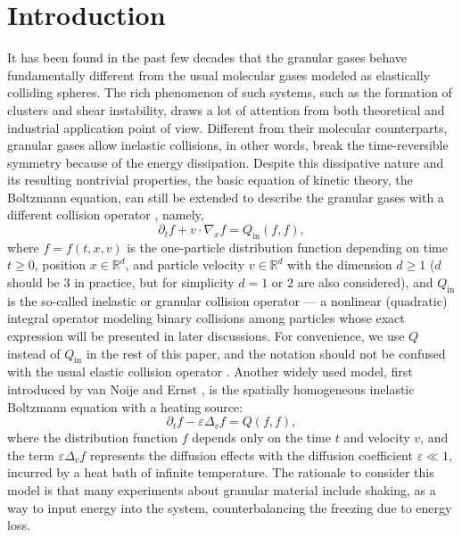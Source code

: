 \documentclass[review, times]{elsarticle}
\begin{document}
\linenumbers

\section{Introduction}

It has been found in the past few decades that the granular gases behave fundamentally different from the usual molecular gases modeled as elastically colliding spheres. The rich phenomenon of such systems, such as the formation of clusters and shear instability, draws a lot of attention from both theoretical and industrial application point of view. Different from their molecular counterparts, granular gases allow inelastic collisions, in other words, break the time-reversible symmetry because of the energy dissipation. Despite this dissipative nature and its resulting nontrivial properties, the basic equation of kinetic theory, the Boltzmann equation, can still be extended to describe the granular gases with a different collision operator \cite{BP04}, namely,
\begin{equation}
\partial_t f + v \cdot \nabla_x f = Q_{\text{in}}(f,f),
\label{boltz}
\end{equation}
where $f=f(t,x,v)$ is the one-particle distribution function depending on time $t \geq 0$, position $x \in \mathbb{R}^d$, and particle velocity $v \in \mathbb{R}^d$ with the dimension $d \geq 1$ ($d$ should be 3 in practice, but for simplicity $d=1$ or $2$ are also considered), and $Q_{\text{in}}$ is the so-called inelastic or granular collision operator --- a nonlinear (quadratic) integral operator modeling binary collisions among particles whose exact expression will be presented in later discussions. For convenience, we use $Q$ instead of $Q_{\text{in}}$ in the rest of this paper, and the notation should not be confused with the usual elastic collision operator \cite{Cercignani}. Another widely used model, first introduced by van Noije and Ernst \cite{noije}, is the spatially homogeneous inelastic Boltzmann equation with a heating source:
\begin{equation} \label{inBoltz}
\partial_tf-\varepsilon \Delta_vf=Q(f,f),
\end{equation}
where the distribution function $f$ depends only on the time $t$ and velocity $v$, and the term $\varepsilon \Delta_vf$ represents the diffusion effects with the diffusion coefficient $\varepsilon \ll 1$, incurred by a heat bath of infinite temperature. The rationale to consider this model is that many experiments about granular material include shaking, as a way to input energy into the system, counterbalancing the freezing due to energy loss.
\end{document}
